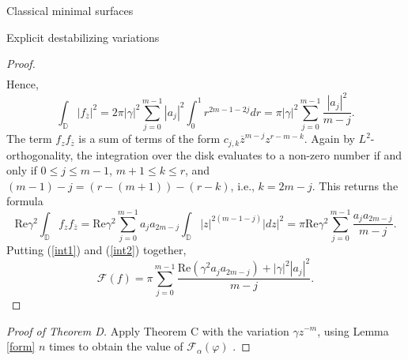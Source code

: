 \documentclass[10pt]{amsart}
\theoremstyle{definition}
\begin{document}
\begin{section}{Classical minimal surfaces}
\begin{subsection}{Explicit destabilizing variations}
\begin{proof}
\begin{align*}
\end{align*}
Hence,
\begin{equation}\label{int1}
    \int_{\mathbb{D}}|f_{\overline{z}}|^2 = 2\pi|\gamma|^2\sum_{j=0}^{m-1}|a_j|^2\int_0^1 r^{2m-1-2j} dr= \pi|\gamma|^2 \sum_{j=0}^{m-1}\frac{|a_j|^2}{m-j}.
\end{equation}
The term $f_zf_{\overline{z}}$ is a sum of terms of the form $c_{j,k}\overline{z}^{m-j}z^{r-m-k}$. Again by $L^2$-orthogonality, the integration over the disk evaluates to a non-zero number if and only if $0\leq j \leq m-1$, $m+1\leq k \leq r$, and
$(m-1)-j = (r-(m+1))-(r-k)$, i.e., $k=2m-j$. This returns the formula
\begin{equation}\label{int2}
    \textrm{Re}\gamma^2\int_{\mathbb{D}} f_zf_{\overline{z}}=\textrm{Re}\gamma^2\sum_{j=0}^{m-1} a_j a_{2m-j}\int_\mathbb{D}|z|^{2(m-1-j)}|dz|^2= \pi\textrm{Re}\gamma^2\sum_{j=0}^{m-1} \frac{a_j a_{2m-j}}{m-j}.
\end{equation}
 Putting (\ref{int1}) and (\ref{int2}) together, $$\mathcal{F}(f) = \pi\sum_{j=0}^{m-1}\frac{\textrm{Re}(\gamma^2a_ja_{2m-j})+|\gamma|^2|a_j|^2}{m-j}.$$
\end{proof}
\begin{proof}[Proof of Theorem D]
Apply Theorem C with the variation $\gamma z^{-m}$, using Lemma \ref{form} $n$ times to obtain the value of $\mathcal{F}_\alpha(\varphi)$ . 
\end{proof}

\end{subsection}








\end{section}
\end{document}
